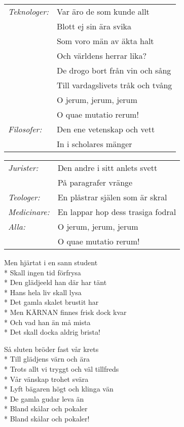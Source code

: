 \begin{SongText}
    \begin{longtable}{p{}p{}}
        \textit{Teknologer:}&Var äro de som kunde allt\\*
        &Blott ej sin ära svika\\*
        &Som voro män av äkta halt\\*
        &Och världens herrar lika?\\*
        &De drogo bort från vin och sång\\*
        &Till vardagslivets tråk och tvång\\*
        &O jerum, jerum, jerum\\*
        &O quae mutatio rerum!\\*
        \textit{Filosofer:}&Den ene vetenskap och vett\\*
        &In i scholares mänger\\*
    \end{longtable}
    \begin{longtable}{p{}p{}}
        \textit{Jurister:}&Den andre i sitt anlets svett\\*
        &På paragrafer vränge\\*
        \textit{Teologer:}&En plåstrar själen som är skral\\*
        \textit{Medicinare:}&En lappar hop dess trasiga fodral\\*
        \textit{Alla:}&O jerum, jerum, jerum\\*
        &O quae mutatio rerum!
        
    \end{longtable}


    \begin{SongVerse}
        Men hjärtat i en sann student\\*
        Skall ingen tid förfrysa\\*
        Den glädjeeld han där har tänt\\*
        Hans hela liv skall lysa\\*
        Det gamla skalet brustit har\\*
        Men KÄRNAN finnes frisk dock kvar\\*
        Och vad han än må mista\\*
        Det skall docka aldrig brista!
    \end{SongVerse}
    \begin{SongVerse}
        Så sluten bröder fast vår krets\\*
        Till glädjens värn och ära\\*
        Trots allt vi tryggt och väl tillfreds\\*
        Vår vänskap trohet svära\\*
        Lyft bägaren högt och klinga vän\\*
        De gamla gudar leva än\\*
        Bland skålar och pokaler\\*
        Bland skålar och pokaler!
    \end{SongVerse}
\end{SongText}


